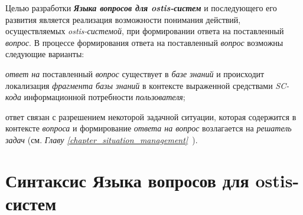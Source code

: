 Целью разработки \textbf{\textit{Языка вопросов для ostis-систем}} и последующего его развития является реализация возможности понимания действий, осуществляемых \textit{ostis-системой}, при формировании ответа на поставленный \textit{вопрос}. В процессе формирования ответа на поставленный \textit{вопрос} возможны следующие варианты:
\begin{textitemize}
	\item \textit{ответ на} поставленный \textit{вопрос} существует в \textit{базе знаний} и происходит локализация \textit{фрагмента базы знаний} в контексте выраженной средствами \textit{SC-кода} информационной потребности \textit{пользователя};
	\item ответ связан с разрешением некоторой задачной ситуации, которая содержится в контексте \textit{вопроса} и формирование \textit{ответа на вопрос} возлагается на \textit{решатель задач} (см. \textit{Главу \ref{chapter_situation_management}~}).
\end{textitemize}

\begin{SCn}
\begin{scnindent}
\end{scnindent}
\begin{scnindent}
\end{scnindent}
\begin{scnindent}
\end{scnindent}
\end{SCn}

\section{Синтаксис Языка вопросов для ostis-систем}
\label{sec_requests_syntax}

